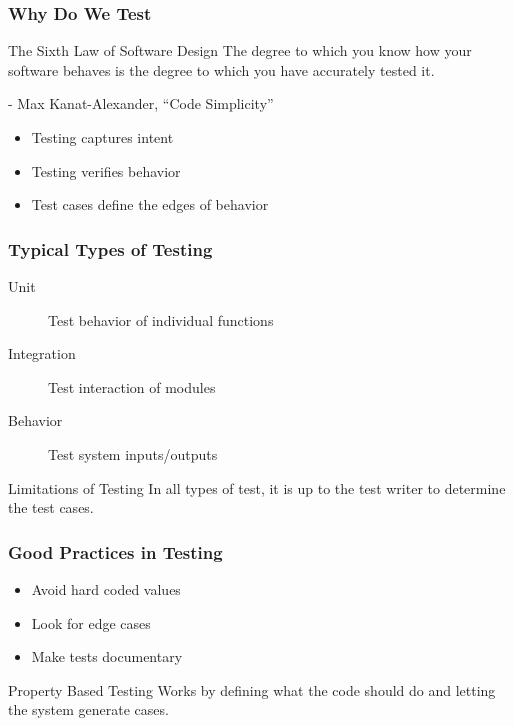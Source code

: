 \begin{frame}
  \frametitle{Why Do We Test}
  \begin{block}{The Sixth Law of Software Design}
    The degree to which you know how your software behaves is the degree to which you have accurately tested it.

    - Max Kanat-Alexander, ``Code Simplicity''
  \end{block}
  \begin{itemize}
    \item Testing captures intent
    \item Testing verifies behavior
    \item Test cases define the edges of behavior 
  \end{itemize}
\end{frame}

\begin{frame}
  \frametitle{Typical Types of Testing}
  \begin{description}
    \item [Unit] Test behavior of individual functions
    \item [Integration] Test interaction of modules
    \item [Behavior] Test system inputs/outputs 
  \end{description}
  \begin{block}{Limitations of Testing}
    In all types of test, it is up to the test writer to determine the test cases.
  \end{block}
\end{frame}

\begin{frame}
  \frametitle{Good Practices in Testing}
  \begin{itemize}
    \item Avoid hard coded values
    \item Look for edge cases
    \item Make tests documentary
  \end{itemize}
  \begin{block}{Property Based Testing}
    Works by defining what the code should do and letting the system generate cases.
  \end{block}
\end{frame}
